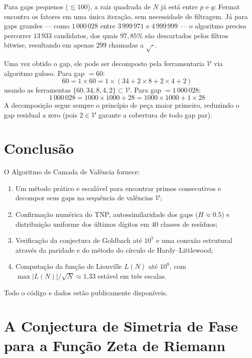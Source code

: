 \documentclass[12pt,a4paper]{article}
\theoremstyle{plain}
\begin{document}
Para gaps pequenos ($\lesssim 100$), a raiz quadrada de $N$ já está
entre $p$ e $q$: Fermat encontra os fatores em uma única iteração,
sem necessidade de filtragem.  Já para gaps grandes --- como
$1\,000\,028$ entre $3\,999\,971$ e $4\,999\,999$ --- o algoritmo
precisa percorrer $13\,933$ candidatos, dos quais $97{,}85\%$ são
descartados pelos filtros bitwise, resultando em apenas $299$
chamadas a $\sqrt{\cdot}$.

Uma vez obtido o gap, ele pode ser decomposto pela ferramentaria
$\mathcal{V}$ via algoritmo guloso.  Para gap $= 60$:
\[
60 = 1\times60 = 1\times(34 + 2\times 8 + 2\times 4 + 2)
\]
usando as ferramentas $\{60, 34, 8, 4, 2\} \subset \mathcal{V}$.
Para gap $= 1\,000\,028$:
\[
1\,000\,028 = 1000\times1000 + 28 = 1000\times1000 + 1\times28
\]
A decomposição segue sempre o princípio de peça maior primeiro,
reduzindo o gap residual a zero (pois $2\in\mathcal{V}$ garante
a cobertura de todo gap par).

\section{Conclusão}

O Algoritmo de Camada de Valência fornece:
\begin{enumerate}
  \item Um método prático e escalável para encontrar primos consecutivos
    e decompor seus gaps na sequência de valências $\mathcal{V}$;
  \item Confirmação numérica do TNP, autossimilaridade dos gaps
    ($H\approx0.5$) e distribuição uniforme dos últimos dígitos em
    40 classes de resíduos;
  \item Verificação da conjectura de Goldbach até $10^7$ e
    uma conexão estrutural através da paridade e do método do círculo
    de Hardy--Littlewood;
  \item Computação da função de Liouville $L(N)$ até $10^{8}$,
    com $\max|L(N)|/\sqrt{N}\approx1.33$ estável em três escalas.
\end{enumerate}

Todo o código e dados estão publicamente disponíveis.

\appendix
\section{A Conjectura de Simetria de Fase para a Função Zeta de Riemann}
\label{ap:phase_symmetry}

\begin{abstract}
Examinamos a condição de contorno $K(s)K(1 - s) \in \mathbb{R}$ para o
operador de valência $K(s) = 2^s - 1$, a qual demonstra-se
algebricamente equivalente a $\mathfrak{R}(s) = 1/2$ ou
$\mathfrak{I}(s) = \frac{n\pi}{\ln 2}$ para $n \in \mathbb{Z}$.  Sob a
premissa de que nenhum zero não trivial da função Zeta de Riemann
$\zeta(s)$ reside fora da reta crítica a menos que pertença a estas
retas excepcionais, apresentamos uma varredura numérica de 200 tais
linhas que valida a ausência de candidatos.  A exclusão analítica
definitiva dessas retas excepcionais permanece um problema aberto
equivalente à Hipótese de Riemann.
\end{abstract}
\end{document}
